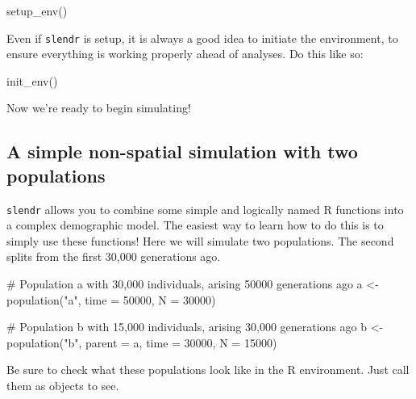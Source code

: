 \documentclass[
  letterpaper,
  DIV=11,
  numbers=noendperiod]{scrartcl}
\newenvironment{Shaded}{\begin{snugshade}}{\end{snugshade}}
\newcommand{\AttributeTok}[1]{\textcolor[rgb]{0.40,0.45,0.13}{#1}}
\newcommand{\CommentTok}[1]{\textcolor[rgb]{0.37,0.37,0.37}{#1}}
\newcommand{\DecValTok}[1]{\textcolor[rgb]{0.68,0.00,0.00}{#1}}
\newcommand{\FunctionTok}[1]{\textcolor[rgb]{0.28,0.35,0.67}{#1}}
\newcommand{\NormalTok}[1]{\textcolor[rgb]{0.00,0.23,0.31}{#1}}
\newcommand{\OtherTok}[1]{\textcolor[rgb]{0.00,0.23,0.31}{#1}}
\newcommand{\StringTok}[1]{\textcolor[rgb]{0.13,0.47,0.30}{#1}}
\begin{document}
\begin{Shaded}
\begin{Highlighting}[]
\FunctionTok{setup\_env}\NormalTok{()}
\end{Highlighting}
\end{Shaded}

Even if \texttt{slendr} is setup, it is always a good idea to initiate
the environment, to ensure everything is working properly ahead of
analyses. Do this like so:

\begin{Shaded}
\begin{Highlighting}[]
\FunctionTok{init\_env}\NormalTok{()}
\end{Highlighting}
\end{Shaded}

Now we're ready to begin simulating!

\hypertarget{a-simple-non-spatial-simulation-with-two-populations}{%
\subsection{A simple non-spatial simulation with two
populations}\label{a-simple-non-spatial-simulation-with-two-populations}}

\texttt{slendr} allows you to combine some simple and logically named R
functions into a complex demographic model. The easiest way to learn how
to do this is to simply use these functions! Here we will simulate two
populations. The second splits from the first 30,000 generations ago.

\begin{Shaded}
\begin{Highlighting}[]
\CommentTok{\# Population a with 30,000 individuals, arising 50000 generations ago}
\NormalTok{a }\OtherTok{\textless{}{-}} \FunctionTok{population}\NormalTok{(}\StringTok{"a"}\NormalTok{, }\AttributeTok{time =} \DecValTok{50000}\NormalTok{, }\AttributeTok{N =} \DecValTok{30000}\NormalTok{)}

\CommentTok{\# Population b with 15,000 individuals, arising 30,000 generations ago}
\NormalTok{b }\OtherTok{\textless{}{-}} \FunctionTok{population}\NormalTok{(}\StringTok{"b"}\NormalTok{, }\AttributeTok{parent =}\NormalTok{ a, }\AttributeTok{time =} \DecValTok{30000}\NormalTok{, }\AttributeTok{N =} \DecValTok{15000}\NormalTok{)}
\end{Highlighting}
\end{Shaded}

Be sure to check what these populations look like in the R environment.
Just call them as objects to see.
\end{document}
